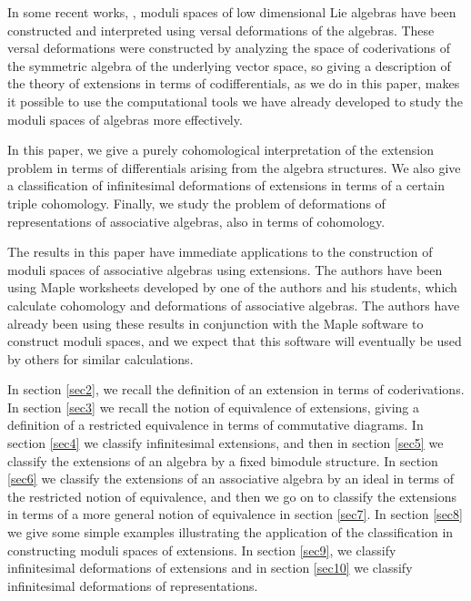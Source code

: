 \documentclass[12pt]{amsart}
\theoremstyle{definition}
\begin{document}
In some recent works, \cite{fp3,fp8,Ott-Pen}, moduli spaces of low
dimensional Lie algebras have been constructed and interpreted using
versal deformations of the algebras.  These versal deformations were
constructed by analyzing the space of coderivations of the symmetric
algebra of the underlying vector space, so giving a description of
the theory of extensions in terms of codifferentials, as we do in
this paper, makes it possible to use the computational tools we have
already developed to study the moduli spaces of algebras more
effectively.

In this paper, we give a purely cohomological interpretation of the
extension problem in terms of differentials arising from the algebra
structures. We also give a classification of infinitesimal
deformations of extensions in terms of a certain triple cohomology.
Finally, we study the problem of deformations of representations of
associative algebras, also in terms of cohomology.

The results in this paper have immediate applications to the construction
of moduli spaces of associative algebras using extensions. The authors
have been using Maple worksheets developed by one of the authors and
his students, which calculate cohomology and deformations of associative
algebras. The authors have already been using these results in conjunction
with the Maple software to construct moduli spaces, and we expect that this
software will eventually be used by others for similar calculations.

In section \ref{sec2}, we recall the definition of an extension in
terms of coderivations. In section \ref{sec3} we recall the notion
of equivalence of extensions, giving a definition of a restricted
equivalence in terms of commutative diagrams. In section \ref{sec4}
we classify infinitesimal extensions, and then in section \ref{sec5}
we classify the extensions of an algebra by a fixed bimodule
structure. In section \ref{sec6} we classify the extensions of an
associative algebra by an ideal in terms of the restricted notion of
equivalence, and then we go on to classify the extensions in terms
of a more general notion of equivalence in section \ref{sec7}. In
section \ref{sec8} we give some simple examples illustrating the
application of the classification in constructing moduli spaces of
extensions. In section \ref{sec9}, we classify infinitesimal
deformations of extensions and in section \ref{sec10} we classify
infinitesimal deformations of representations.
\end{document}
